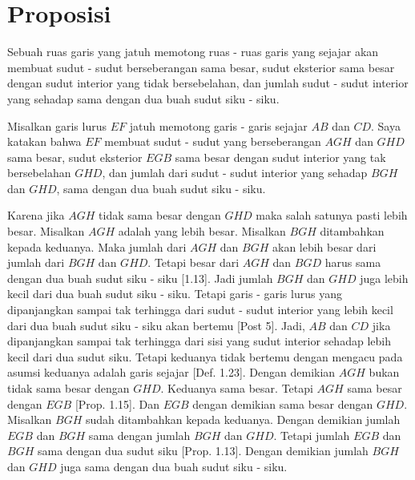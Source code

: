 \documentclass[a4paper]{book}
\begin{document}
\section*{\centering Proposisi \thesection} 
Sebuah ruas garis yang jatuh memotong ruas - ruas garis yang sejajar akan membuat
sudut - sudut berseberangan sama besar, sudut eksterior sama besar dengan sudut
interior yang tidak bersebelahan, dan jumlah sudut - sudut interior yang sehadap
sama dengan dua buah sudut siku - siku.

\begin{center}
\end{center}

Misalkan garis lurus $EF$ jatuh memotong garis - garis sejajar $AB$ dan $CD$. 
Saya katakan bahwa $EF$ membuat sudut - sudut yang berseberangan
$AGH$ dan $GHD$ sama besar, sudut eksterior $EGB$ sama besar dengan sudut interior
yang tak bersebelahan $GHD$, dan jumlah dari sudut - sudut interior yang sehadap
$BGH$ dan $GHD$, sama dengan dua buah sudut siku - siku.

Karena jika $AGH$ tidak sama besar dengan $GHD$ maka salah satunya pasti
lebih besar. Misalkan $AGH$ adalah yang lebih besar. Misalkan $BGH$ 
ditambahkan kepada keduanya. Maka jumlah dari $AGH$ dan $BGH$ akan 
lebih besar dari jumlah dari $BGH$ dan $GHD$. Tetapi besar dari $AGH$
dan $BGD$ harus sama dengan dua buah sudut siku - siku [1.13]. Jadi
jumlah $BGH$ dan $GHD$ juga lebih kecil dari dua buah sudut siku - siku.
Tetapi garis - garis lurus yang dipanjangkan sampai tak terhingga dari
sudut - sudut interior yang lebih kecil dari dua buah sudut siku - siku 
akan bertemu [Post 5]. Jadi, $AB$ dan $CD$ jika dipanjangkan sampai tak
terhingga dari sisi yang sudut interior sehadap lebih kecil dari dua sudut
siku. Tetapi keduanya tidak bertemu dengan mengacu pada asumsi keduanya
adalah garis sejajar [Def. 1.23]. Dengan demikian $AGH$ bukan tidak sama
besar dengan $GHD$. Keduanya sama besar. Tetapi $AGH$ sama besar dengan
$EGB$ [Prop. 1.15]. Dan $EGB$ dengan demikian sama besar dengan $GHD$.
Misalkan $BGH$ sudah ditambahkan kepada keduanya. Dengan demikian jumlah
$EGB$ dan $BGH$ sama dengan jumlah $BGH$ dan $GHD$. Tetapi jumlah
$EGB$ dan $BGH$ sama dengan dua sudut siku [Prop. 1.13]. Dengan demikian
jumlah $BGH$ dan $GHD$ juga sama dengan dua buah sudut siku - siku.
\end{document}
